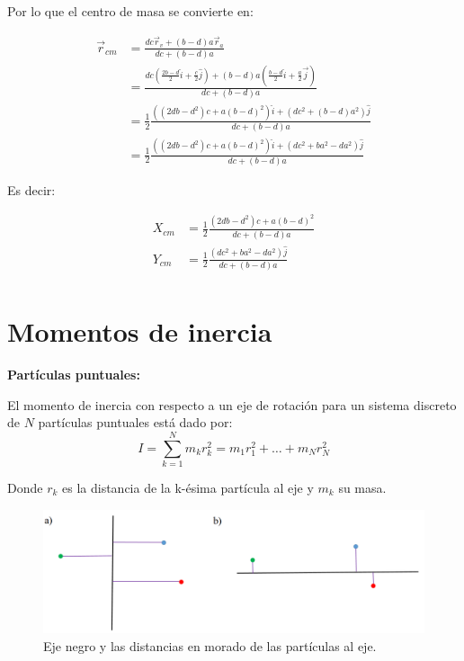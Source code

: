 \documentclass[a4paper,11pt]{article}
\begin{document}
Por lo que el centro de masa se convierte en:

\begin{align*}
\vec{r}_{cm}  &= \frac{  dc \vec{r}_v+  (b-d)a \vec{r}_a}{ dc + (b-d)a}\\
&= \frac{  dc ( \frac{2b-d}{2}\hat{i} + \frac{c}{2}\hat{j})+  (b-d)a (\frac{b-d}{2} \hat{i} + \frac{a}{2} \vec{j})}{ dc + (b-d)a}\\
& =\frac{1}{2} \frac{  ((2db-d^2)c +a(b-d)^2) \hat{i} + (dc^2+(b-d)a^2)\hat{j}}{ dc + (b-d)a}\\
& = \frac{1}{2} \frac{   ((2db-d^2)c +a(b-d)^2) \hat{i} + (dc^2+ba^2-da^2)\hat{j}}{ dc + (b-d)a}
\end{align*}

Es decir:


\begin{align*}
X_{cm}  &= \frac{1}{2} \frac{   (2db-d^2)c +a(b-d)^2 }{ dc + (b-d)a}\\
Y_{cm}&= \frac{1}{2} \frac{   (dc^2+ba^2-da^2)\hat{j}}{ dc + (b-d)a}\\
\end{align*}







\section{Momentos de inercia}

\textbf{Partículas puntuales:}

El momento de inercia con respecto a un eje de rotación para un sistema discreto de $N$ partículas puntuales  está dado por:
\begin{equation}
I = \sum_{k=1}^{N} m_k r_k^2 = m_1 r_1^2 + \dots + m_N r_N^2
\end{equation}

Donde $ r_k$ es la distancia de la k-ésima partícula al eje y $m_k$ su masa. 


\begin{figure}[H]
	\centering
	\includegraphics[width=\linewidth]{./im/rot1}
		\caption{Eje negro y las distancias en morado de las partículas al eje.}
\end{figure}
\end{document}
